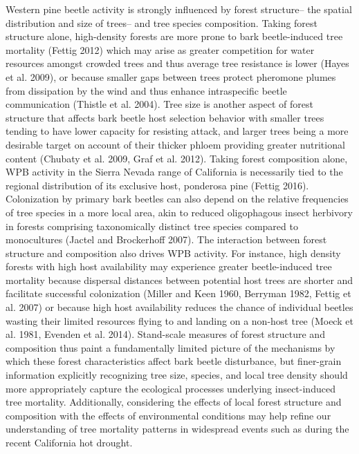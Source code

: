 \documentclass[]{article}
\begin{document}
Western pine beetle activity is strongly influenced by forest
structure-- the spatial distribution and size of trees-- and tree
species composition. Taking forest structure alone, high-density forests
are more prone to bark beetle-induced tree mortality (Fettig 2012) which
may arise as greater competition for water resources amongst crowded
trees and thus average tree resistance is lower (Hayes et al. 2009), or
because smaller gaps between trees protect pheromone plumes from
dissipation by the wind and thus enhance intraspecific beetle
communication (Thistle et al. 2004). Tree size is another aspect of
forest structure that affects bark beetle host selection behavior with
smaller trees tending to have lower capacity for resisting attack, and
larger trees being a more desirable target on account of their thicker
phloem providing greater nutritional content (Chubaty et al. 2009, Graf
et al. 2012). Taking forest composition alone, WPB activity in the
Sierra Nevada range of California is necessarily tied to the regional
distribution of its exclusive host, ponderosa pine (Fettig 2016).
Colonization by primary bark beetles can also depend on the relative
frequencies of tree species in a more local area, akin to reduced
oligophagous insect herbivory in forests comprising taxonomically
distinct tree species compared to monocultures (Jactel and Brockerhoff
2007). The interaction between forest structure and composition also
drives WPB activity. For instance, high density forests with high host
availability may experience greater beetle-induced tree mortality
because dispersal distances between potential host trees are shorter and
facilitate successful colonization (Miller and Keen 1960, Berryman 1982,
Fettig et al. 2007) or because high host availability reduces the chance
of individual beetles wasting their limited resources flying to and
landing on a non-host tree (Moeck et al. 1981, Evenden et al. 2014).
Stand-scale measures of forest structure and composition thus paint a
fundamentally limited picture of the mechanisms by which these forest
characteristics affect bark beetle disturbance, but finer-grain
information explicitly recognizing tree size, species, and local tree
density should more appropriately capture the ecological processes
underlying insect-induced tree mortality. Additionally, considering the
effects of local forest structure and composition with the effects of
environmental conditions may help refine our understanding of tree
mortality patterns in widespread events such as during the recent
California hot drought.
\end{document}
